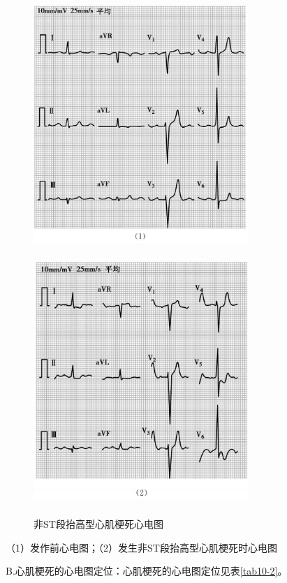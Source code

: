 \begin{figure}[!htbp]
 \centering
 \includegraphics[width=3.19792in,height=3.75in,keepaspectratio]{./images/Image00070.jpg}\\
 \includegraphics[width=3.19792in,height=3.75in,keepaspectratio]{./images/Image00071.jpg}
 \captionsetup{justification=centering}
 \caption{非ST段抬高型心肌梗死心电图}
 \label{fig10-1}
  \end{figure} 

（1）发作前心电图；（2）发生非ST段抬高型心肌梗死时心电图

B.心肌梗死的心电图定位：心肌梗死的心电图定位见表\ref{tab10-2}。

